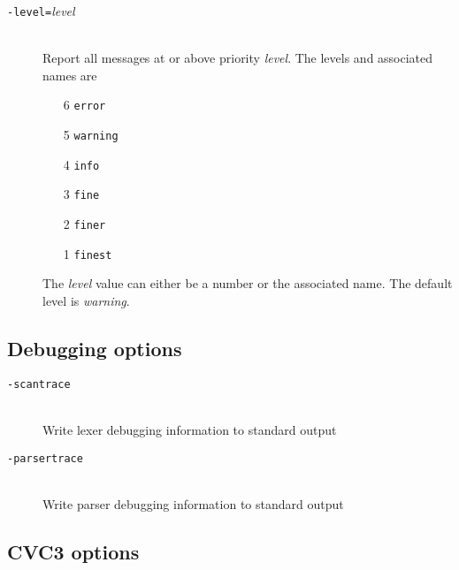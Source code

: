 \documentclass[12pt,fleqn]{article}
\newcommand{\optionb}[1]{\item[\texttt{-{#1}}]\ \\}
\newcommand{\optionv}[2]{\item[\texttt{-{#1}=}\mdseries\textit{#2}]\ \\}
\begin{document}
\begin{description}
  \optionv{level}{level}  Report all messages at or above 
     priority \textit{level}.  The levels and associated names are
     \begin{enumerate}
     \item [6] \texttt{error}
     \item [5] \texttt{warning}
     \item [4] \texttt{info}
     \item [3] \texttt{fine}
     \item [2] \texttt{finer}
     \item [1] \texttt{finest}
     \end{enumerate}
     The \textit{level} value can either be a number or the associated name.
     The default level is \emph{warning}.

\end{description}

\subsection{Debugging options}
\begin{description}
\optionb{scantrace} Write lexer debugging information to standard output 
\optionb{parsertrace} 
  Write parser debugging information to standard output 
\end{description}

\subsection{CVC3 options}
\end{document}
